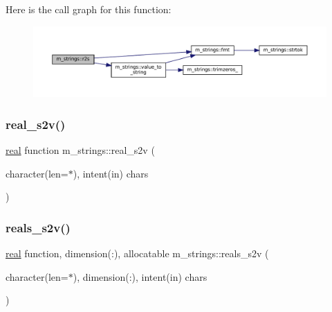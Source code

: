 Here is the call graph for this function\+:
\nopagebreak
\begin{figure}[H]
\begin{center}
\leavevmode
\includegraphics[width=350pt]{namespacem__strings_ab67ea90007b3f2eb308a5fe8d1cf0df1_cgraph}
\end{center}
\end{figure}
\mbox{\label{namespacem__strings_aac80fa95c07cf00d5442a88962c5e6e9}} 
\subsubsection{\texorpdfstring{real\+\_\+s2v()}{real\_s2v()}}
{\footnotesize\ttfamily \mbox{\hyperlink{interfacem__strings_1_1real}{real}} function m\+\_\+strings\+::real\+\_\+s2v (\begin{DoxyParamCaption}\item[{character(len=$\ast$), intent(in)}]{chars }\end{DoxyParamCaption})\hspace{0.3cm}{\ttfamily [private]}}

\mbox{\label{namespacem__strings_ac62b68d2aeb2b404a3340101f2cb7f84}} 
\subsubsection{\texorpdfstring{reals\+\_\+s2v()}{reals\_s2v()}}
{\footnotesize\ttfamily \mbox{\hyperlink{interfacem__strings_1_1real}{real}} function, dimension(\+:), allocatable m\+\_\+strings\+::reals\+\_\+s2v (\begin{DoxyParamCaption}\item[{character(len=$\ast$), dimension(\+:), intent(in)}]{chars }\end{DoxyParamCaption})\hspace{0.3cm}{\ttfamily [private]}}

